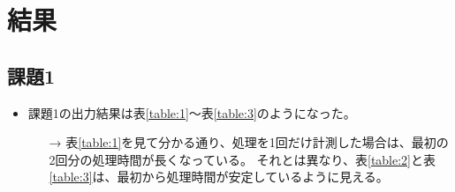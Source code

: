 \section{結果}
\subsection{課題1}
\begin{itemize}
  \item 課題1の出力結果は表\ref{table:1}～表\ref{table:3}のようになった。
  \begin{itemize}
    \item[→] 表\ref{table:1}を見て分かる通り、処理を1回だけ計測した場合は、最初の2回分の処理時間が長くなっている。
    それとは異なり、表\ref{table:2}と表\ref{table:3}は、最初から処理時間が安定しているように見える。


\end{itemize}
\end{itemize}
